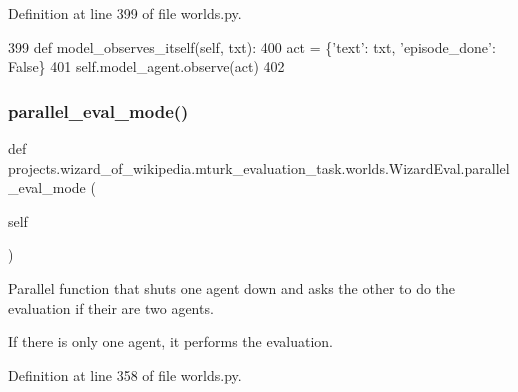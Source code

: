 Definition at line 399 of file worlds.\+py.


\begin{DoxyCode}
399     \textcolor{keyword}{def }model\_observes\_itself(self, txt):
400         act = \{\textcolor{stringliteral}{'text'}: txt, \textcolor{stringliteral}{'episode\_done'}: \textcolor{keyword}{False}\}
401         self.model\_agent.observe(act)
402 
\end{DoxyCode}
\mbox{\label{classprojects_1_1wizard__of__wikipedia_1_1mturk__evaluation__task_1_1worlds_1_1WizardEval_a1cffb86be3a550ac33519b487959ec8c}} 
\subsubsection{\texorpdfstring{parallel\+\_\+eval\+\_\+mode()}{parallel\_eval\_mode()}}
{\footnotesize\ttfamily def projects.\+wizard\+\_\+of\+\_\+wikipedia.\+mturk\+\_\+evaluation\+\_\+task.\+worlds.\+Wizard\+Eval.\+parallel\+\_\+eval\+\_\+mode (\begin{DoxyParamCaption}\item[{}]{self }\end{DoxyParamCaption})}

\begin{DoxyVerb}Parallel function that shuts one agent down and asks the other to do the
evaluation if their are two agents.

If there is only one agent, it performs the evaluation.
\end{DoxyVerb}
 

Definition at line 358 of file worlds.\+py.


